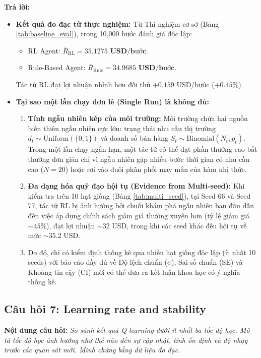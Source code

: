 \documentclass[12pt,a4paper]{article}
\begin{document}
\textbf{Trả lời:}
\begin{itemize}
    \item \textbf{Kết quả đo đạc từ thực nghiệm:} 
    Từ Thí nghiệm cơ sở (Bảng \ref{tab:baseline_eval}), trong 10,000 bước đánh giá độc lập:
    \begin{itemize}
        \item RL Agent: $\bar{R}_{\text{RL}} = \mathbf{35.1275 \text{ USD/bước}}$.
        \item Rule-Based Agent: $\bar{R}_{\text{Rule}} = \mathbf{34.9685 \text{ USD/bước}}$.
    \end{itemize}
    Tác tử RL đạt lợi nhuận nhỉnh hơn đối thủ $+0.159$ USD/bước ($+0.45\%$).
    \item \textbf{Tại sao một lần chạy đơn lẻ (Single Run) là không đủ:}
    \begin{enumerate}
        \item \textbf{Tính ngẫu nhiên kép của môi trường:} Môi trường chứa hai nguồn biến thiên ngẫu nhiên cực lớn: trạng thái nhu cầu thị trường $d_t \sim \text{Uniform}(\{0, 1\})$ và doanh số bán hàng $S_t \sim \text{Binomial}(N_t, p_t)$. Trong một lần chạy ngắn hạn, một tác tử có thể đạt phần thưởng cao bất thường đơn giản chỉ vì ngẫu nhiên gặp nhiều bước thời gian có nhu cầu cao ($N=20$) hoặc rơi vào đuôi phân phối may mắn của hàm nhị thức.
        \item \textbf{Đa dạng hóa quỹ đạo hội tụ (Evidence from Multi-seed):} Khi kiểm tra trên 10 hạt giống (Bảng \ref{tab:multi_seed}), tại Seed 66 và Seed 77, tác tử RL bị ảnh hưởng bởi chuỗi khám phá ngẫu nhiên ban đầu dẫn đến việc áp dụng chính sách giảm giá thường xuyên hơn (tỷ lệ giảm giá $\sim 45\%$), đạt lợi nhuận $\sim 32$ USD, trong khi các seed khác đều hội tụ về mức $\sim 35.2$ USD.
        \item Do đó, chỉ có kiểm định thống kê qua nhiều hạt giống độc lập (ít nhất 10 seeds) với báo cáo đầy đủ về Độ lệch chuẩn ($\sigma$), Sai số chuẩn (SE) và Khoảng tin cậy (CI) mới có thể đưa ra kết luận khoa học có ý nghĩa thống kê.
    \end{enumerate}
\end{itemize}

\subsection{Câu hỏi 7: Learning rate and stability}
\textbf{Nội dung câu hỏi:} \textit{So sánh kết quả Q-learning dưới ít nhất ba tốc độ học. Mô tả tốc độ học ảnh hưởng như thế nào đến sự cập nhật, tính ổn định và độ nhạy trước các quan sát mới. Minh chứng bằng dữ liệu đo đạc.}
\end{document}
